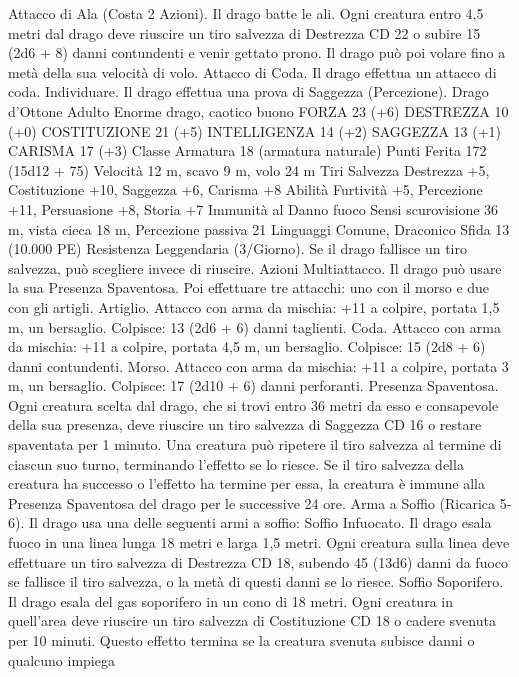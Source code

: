 \begin{multicols}{2}
Attacco di Ala (Costa 2 Azioni). Il drago batte le ali. Ogni
creatura entro 4,5 metri dal drago deve riuscire un tiro salvezza
di Destrezza CD 22 o subire 15 (2d6 + 8) danni contundenti e
venir gettato prono. Il drago può poi volare fino a metà della sua
velocità di volo.
Attacco di Coda. Il drago effettua un attacco di coda.
Individuare. Il drago effettua una prova di Saggezza
(Percezione).
Drago d’Ottone Adulto
Enorme drago, caotico buono
FORZA 23 (+6)
DESTREZZA 10 (+0)
COSTITUZIONE 21 (+5)
INTELLIGENZA 14 (+2)
SAGGEZZA 13 (+1)
CARISMA 17 (+3)
Classe Armatura 18 (armatura naturale)
Punti Ferita 172 (15d12 + 75)
Velocità 12 m, scavo 9 m, volo 24 m
Tiri Salvezza Destrezza +5, Costituzione +10, Saggezza +6,
Carisma +8
Abilità Furtività +5, Percezione +11, Persuasione +8, Storia +7
Immunità al Danno fuoco
Sensi scurovisione 36 m, vista cieca 18 m, Percezione passiva 21
Linguaggi Comune, Draconico
Sfida 13 (10.000 PE)
Resistenza Leggendaria (3/Giorno). Se il drago fallisce un tiro
salvezza, può scegliere invece di riuscire.
Azioni
Multiattacco. Il drago può usare la sua Presenza Spaventosa. Poi
effettuare tre attacchi: uno con il morso e due con gli artigli.
Artiglio. Attacco con arma da mischia: +11 a colpire, portata 1,5
m, un bersaglio.
Colpisce: 13 (2d6 + 6) danni taglienti.
Coda. Attacco con arma da mischia: +11 a colpire, portata 4,5
m, un bersaglio.
Colpisce: 15 (2d8 + 6) danni contundenti.
Morso. Attacco con arma da mischia: +11 a colpire, portata 3 m,
un bersaglio.
Colpisce: 17 (2d10 + 6) danni perforanti.
Presenza Spaventosa. Ogni creatura scelta dal drago, che si trovi
entro 36 metri da esso e consapevole della sua presenza, deve
riuscire un tiro salvezza di Saggezza CD 16 o restare spaventata per
1 minuto. Una creatura può ripetere il tiro salvezza al termine di
ciascun suo turno, terminando l’effetto se lo riesce. Se il tiro salvezza
della creatura ha successo o l’effetto ha termine per essa, la creatura è
immune alla Presenza Spaventosa del drago per le successive 24 ore.
Arma a Soffio (Ricarica 5-6). Il drago usa una delle seguenti armi
a soffio:
Soffio Infuocato. Il drago esala fuoco in una linea lunga 18 metri e
larga 1,5 metri. Ogni creatura sulla linea deve effettuare un tiro
salvezza di Destrezza CD 18, subendo 45 (13d6) danni da fuoco se
fallisce il tiro salvezza, o la metà di questi danni se lo riesce.
Soffio Soporifero. Il drago esala del gas soporifero in un cono di 18
metri. Ogni creatura in quell’area deve riuscire un tiro salvezza di
Costituzione CD 18 o cadere svenuta per 10 minuti. Questo effetto
termina se la creatura svenuta subisce danni o qualcuno impiega

\end{multicols}
